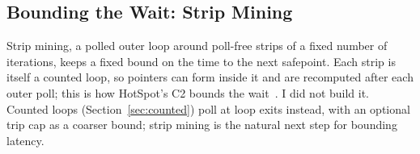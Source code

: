 \subsection{Bounding the Wait: Strip Mining}
Strip mining, a polled outer loop around poll-free strips of a fixed number of
iterations, keeps a fixed bound on the time to the next safepoint. Each strip
is itself a counted loop, so pointers can form inside it and are recomputed
after each outer poll; this is how HotSpot's C2 bounds the
wait~\cite{jdk_stripmining}. I did not build it. Counted loops
(Section~\ref{sec:counted}) poll at loop exits instead, with an optional trip
cap as a coarser bound; strip mining is the natural next step for bounding
latency.
